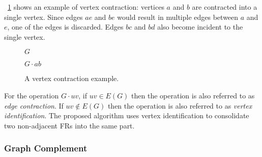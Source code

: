 \figurename~\ref{fig:contract} shows an example of vertex contraction: vertices \(a\) and \(b\) are contracted into
a single vertex.  Since edges \(ae\) and \(be\) would result in multiple edges between \(a\) and \(e\), one of the
edges is discarded.  Edges \(bc\) and \(bd\) also become incident to the single vertex.

\begin{figure}[H]
  \begin{minipage}{2.75in}
    \centering

    \(G\)
  \end{minipage}
  \begin{minipage}{2.75in}
    \centering

    \(G\cdot ab\)
  \end{minipage}
  \caption{A vertex contraction example.}
  \label{fig:contract}
\end{figure}

For the operation \(G\cdot uv\), if \(uv\in E(G)\) then the operation is also referred to as \emph{edge
  contraction}.  If \(uv\notin E(G)\) then the operation is also referred to as \emph{vertex identification}.  The
proposed algorithm uses vertex identification to consolidate two non-adjacent FRs into the same part.

\subsubsection{Graph Complement}\label{sec:sub:sub:complement}

